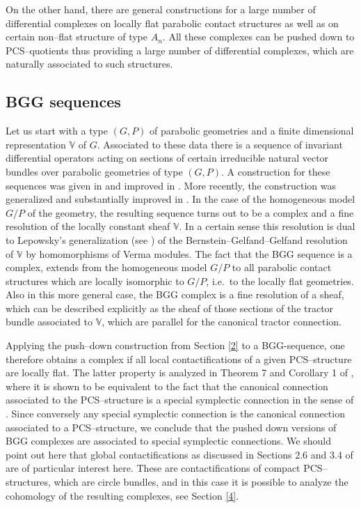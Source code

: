 \documentclass[12pt,a4paper]{amsart}
\def\Bbb{\mathbb}
\numberwithin{theorem}{section}
\theoremstyle{definition}
\theoremstyle{remark}
\begin{document}
On the other hand, there are general constructions for a large number
of differential complexes on locally flat parabolic contact structures
as well as on certain non--flat structure of type $A_n$. All these
complexes can be pushed down to PCS--quotients thus providing a large
number of differential complexes, which are naturally associated to
such structures.

\subsection{BGG sequences}\label{3.1} 
Let us start with a type $(G,P)$ of parabolic geometries and a finite
dimensional representation $\Bbb V$ of $G$. Associated to these data
there is a sequence of invariant differential operators acting on
sections of certain irreducible natural vector bundles over parabolic
geometries of type $(G,P)$. A construction for these sequences was
given in \cite{CSS-BGG} and improved in \cite{Calderbank-Diemer}. More
recently, the construction was generalized and substantially improved
in \cite{Rel-BGG2}. In the case of the homogeneous model $G/P$ of the
geometry, the resulting sequence turns out to be a complex and a fine
resolution of the locally constant sheaf $\Bbb V$. In a certain sense
this resolution is dual to Lepowsky's generalization (see
\cite{Lepowsky}) of the Bernstein--Gelfand--Gelfand resolution of
$\Bbb V$ by homomorphisms of Verma modules. The fact that the BGG
sequence is a complex, extends from the homogeneous model $G/P$ to all
parabolic contact structures which are locally isomorphic to $G/P$,
i.e.~to the locally flat geometries. Also in this more general case,
the BGG complex is a fine resolution of a sheaf, which can be described
explicitly as the sheaf of those sections of the tractor bundle
associated to $\Bbb V$, which are parallel for the canonical tractor
connection. 

Applying the push--down construction from Section \ref{2} to a
BGG-sequence, one therefore obtains a complex if all local
contactifications of a given PCS--structure are locally flat. The
latter property is analyzed in Theorem 7 and Corollary 1 of
\cite{PCS2}, where it is shown to be equivalent to the fact that the
canonical connection associated to the PCS--structure is a special
symplectic connection in the sense of
\cite{Cahen-Schwachhoefer}. Since conversely any special symplectic
connection is the canonical connection associated to a PCS--structure,
we conclude that the pushed down versions of BGG complexes are
associated to special symplectic connections. We should point out here
that global contactifications as discussed in Sections 2.6 and 3.4 of
\cite{PCS2} are of particular interest here. These are
contactifications of compact PCS--structures, which are circle
bundles, and in this case it is possible to analyze the cohomology of
the resulting complexes, see Section \ref{4}.
\end{document}
